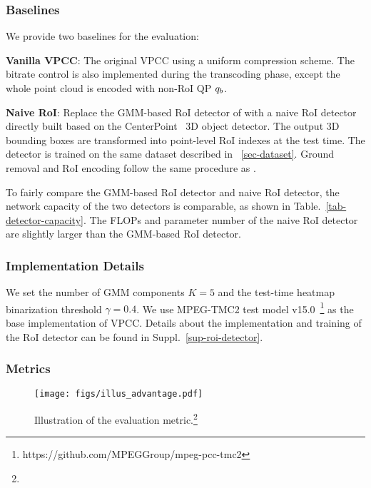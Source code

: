 \subsubsection{Baselines}
We provide two baselines for the evaluation:

\textbf{Vanilla VPCC}: The original VPCC using a uniform compression scheme. The bitrate control is also implemented during the transcoding phase, except the whole point cloud is encoded with non-RoI QP ${q_{b}}$.

\textbf{Naive RoI}: Replace the GMM-based RoI detector of \methodname{} with a naive RoI detector directly built based on the CenterPoint~\cite{yin2021center} 3D object detector. The output 3D bounding boxes are transformed into point-level RoI indexes at the test time. The detector is trained on the same dataset described in ~\cref{sec-dataset}. Ground removal and RoI encoding follow the same procedure as \methodname{}.

To fairly compare the GMM-based RoI detector and naive RoI detector, the network capacity of the two detectors is comparable, as shown in Table.~\ref{tab-detector-capacity}. The FLOPs and parameter number of the naive RoI detector are slightly larger than the GMM-based RoI detector.

\subsubsection{Implementation Details}
\label{sec-implementation-details}
We set the number of GMM components $K=5$ and the test-time heatmap binarization threshold $\gamma=0.4$. We use MPEG-TMC2 test model v15.0~\footnote{https://github.com/MPEGGroup/mpeg-pcc-tmc2} as the base implementation of VPCC. Details about the implementation and training of the RoI detector can be found in Suppl.~\ref{sup-roi-detector}.


\subsubsection{Metrics}

\begin{figure}[t]
  \centering
    \texttt{[image: figs/illus\_advantage.pdf]}
  \caption[]{Illustration of the evaluation metric.\protect\footnote{}}
  \label{fig-metric-illus}
\vspace{-0.4cm}
\end{figure}

